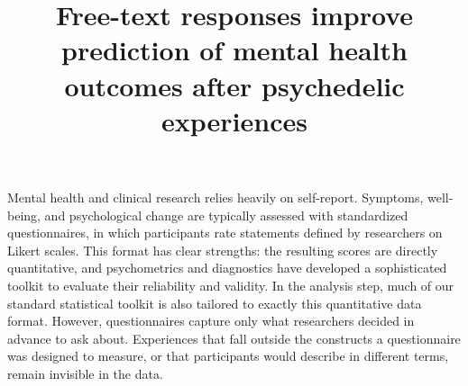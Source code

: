 \documentclass[man,floatsintext]{apa7}
\title{Free-text responses improve prediction of mental health outcomes after psychedelic experiences}
\begin{document}
	\maketitle

\noindent{}



Mental health and clinical research relies heavily on self-report. Symptoms, well-being, and psychological change are typically assessed with standardized questionnaires, in which participants rate statements defined by researchers on Likert scales. This format has clear strengths: the resulting scores are directly quantitative, and psychometrics and diagnostics have developed a sophisticated toolkit to evaluate their reliability and validity. In the analysis step, much of our standard statistical toolkit is also tailored to exactly this quantitative data format. However, questionnaires capture only what researchers decided in advance to ask about. Experiences that fall outside the constructs a questionnaire was designed to measure, or that participants would describe in different terms, remain invisible in the data.
\end{document}
